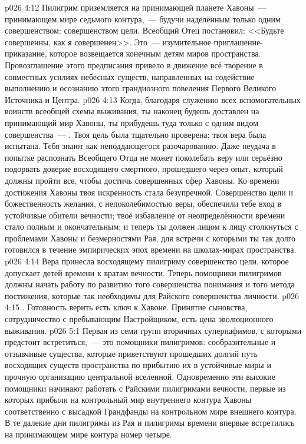 \vs p026 4:12 Пилигрим приземляется на принимающей планете Хавоны~--- принимающем мире седьмого контура,~--- будучи наделённым только одним совершенством: совершенством цели. Всеобщий Отец постановил: <<Будьте совершенны, как я совершенен>>. Это~--- изумительное приглашение\hyp{}приказание, которое возвещается конечным детям миров пространства. Провозглашение этого предписания привело в движение всё творение в совместных усилиях небесных существ, направленных на содействие выполнению и осознанию этого грандиозного повеления Первого Великого Источника и Центра.
\vs p026 4:13 Когда, благодаря служению всех вспомогательных воинств всеобщей схемы выживания, ты наконец будешь доставлен на принимающий мир Хавоны, ты прибудешь туда только с одним видом совершенства~--- . Твоя цель была тщательно проверена; твоя вера была испытана. Тебя знают как неподдающегося разочарованию. Даже неудача в попытке распознать Всеобщего Отца не может поколебать веру или серьёзно подорвать доверие восходящего смертного, прошедшего через опыт, который должны пройти все, чтобы достичь совершенных сфер Хавоны. Ко времени достижения Хавоны твоя искренность стала безупречной. Совершенство цели и божественность желания, с непоколебимостью веры, обеспечили тебе вход в устойчивые обители вечности; твоё избавление от неопределённости времени стало полным и окончательным; и теперь ты должен лицом к лицу столкнуться с проблемами Хавоны и безмерностями Рая, для встречи с которыми ты так долго готовился в течение эмпирических эпох времени на школах\hyp{}мирах пространства.
\vs p026 4:14 Вера принесла восходящему пилигриму совершенство цели, которое допускает детей времени к вратам вечности. Теперь помощники пилигримов должны начать работу по развитию того совершенства понимания и того метода постижения, которые так необходимы для Райского совершенства личности.
\vs p026 4:15 . Готовность верить есть ключ к Хавоне. Принятие сыновства, сотрудничество с пребывающим Настройщиком, есть цена эволюционного выживания.
\vs p026 5:1 Первая из семи групп вторичных супернафимов, с которыми предстоит встретиться,~--- это помощники пилигримов: сообразительные и отзывчивые существа, которые приветствуют прошедших долгий путь восходящих существ пространства по прибытию их в устойчивые миры и прочную организацию центральной вселенной. Одновременно эти высокие помощники начинают работать с Райскими пилигримами вечности, первые из которых прибыли на контрольный мир внутреннего контура Хавоны соответственно с высадкой Грандфанды на контрольном мире внешнего контура. В те далекие дни пилигримы из Рая и пилигримы времени впервые встретились на принимающем мире контура номер четыре.
